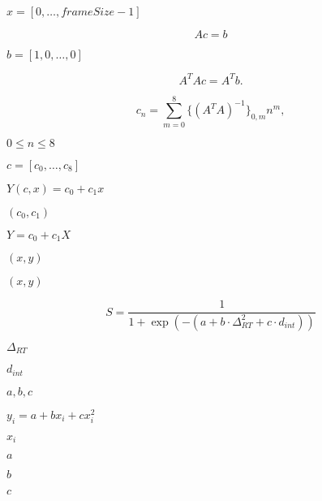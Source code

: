 \documentclass{article}
\begin{document}
$ x=[0,\ldots, frameSize-1] $
\pagebreak

\[ Ac=b \]
\pagebreak

$ b=[1,0,\ldots,0] $
\pagebreak

\[ A^TAc=A^Tb. \]
\pagebreak

\[ c_n=\sum_{m=0}^8 \{(A^TA)^{-1}\}_{0,m} n^m, \]
\pagebreak

$ 0\le n \le 8$
\pagebreak

$c=[c_0,\ldots,c_8] $
\pagebreak

$ Y(c,x) = c_0 + c_1 x $
\pagebreak

$ (c_0,c_1) $
\pagebreak

$ Y = c_0 + c_1 X $
\pagebreak

$ (x, y) $
\pagebreak

$ (x,y) $
\pagebreak

\[ S = \frac{1}{1 + \exp(-(a + b \cdot \Delta_{RT}^2 + c \cdot d_{int}))} \]
\pagebreak

$ \Delta_{RT} $
\pagebreak

$ d_{int} $
\pagebreak

$ a, b, c $
\pagebreak

$y_i = a + bx_i + cx_i^2$
\pagebreak

$x_i$
\pagebreak

$a$
\pagebreak

$b$
\pagebreak

$c$
\pagebreak
\end{document}

